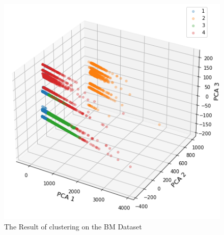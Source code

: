 \documentclass{mpaper}
\begin{document}
\begin{figure}
\centering
\begin{center}
\includegraphics[scale=0.45]{bm_clustering.png}
\end{center}
\caption{\label{fig-BMcl}The Result of clustering on the BM Dataset}
\end{figure}
\end{document}
